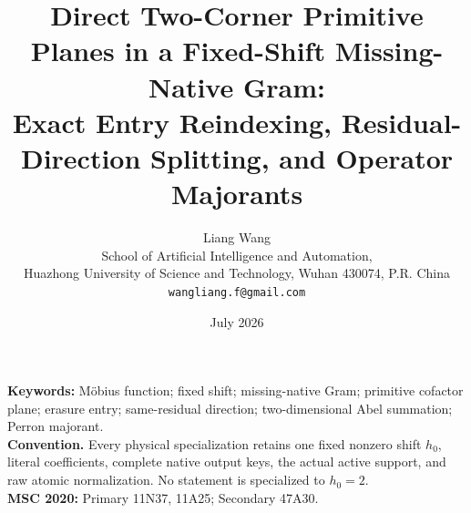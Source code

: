 \documentclass[11pt]{article}
\title{Direct Two-Corner Primitive Planes in a Fixed-Shift Missing-Native Gram:\\
Exact Entry Reindexing, Residual-Direction Splitting, and Operator Majorants}
\author{Liang Wang\\
School of Artificial Intelligence and Automation,\\
Huazhong University of Science and Technology, Wuhan 430074, P.R. China\\
\texttt{wangliang.f@gmail.com}}
\date{July 2026}
\theoremstyle{remark}
\begin{document}
\maketitle


\noindent\textbf{Keywords:} M\"obius function; fixed shift; missing-native Gram;
primitive cofactor plane; erasure entry; same-residual direction;
two-dimensional Abel summation; Perron majorant.\\[0.5em]
\noindent\textbf{Convention.} Every physical specialization retains one
fixed nonzero shift \(h_0\), literal coefficients, complete native output
keys, the actual active support, and raw atomic normalization.  No
statement is specialized to \(h_0=2\).\\[0.5em]
\noindent\textbf{MSC 2020:} Primary 11N37, 11A25; Secondary 47A30.











\begingroup
\small
\raggedright


\endgroup
\end{document}
